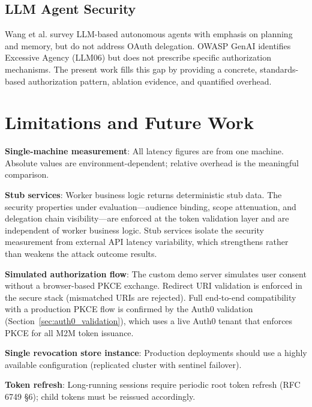 \documentclass[journal]{IEEEtran}
\begin{document}
\subsection{LLM Agent Security}

Wang et al. \cite{wang2024survey} survey LLM-based autonomous agents with
emphasis on planning and memory, but do not address OAuth delegation. OWASP GenAI
\cite{owasp_genai} identifies Excessive Agency (LLM06) but does not prescribe
specific authorization mechanisms. The present work fills this gap by providing
a concrete, standards-based authorization pattern, ablation evidence, and
quantified overhead.


\section{Limitations and Future Work}
\label{sec:limitations}

\textbf{Single-machine measurement}: All latency figures are from one machine.
Absolute values are environment-dependent; relative overhead is the meaningful
comparison.

\textbf{Stub services}: Worker business logic returns deterministic stub data.
The security properties under evaluation---audience binding, scope attenuation,
and delegation chain visibility---are enforced at the token validation layer and
are independent of worker business logic. Stub services isolate the security
measurement from external API latency variability, which strengthens rather than
weakens the attack outcome results.

\textbf{Simulated authorization flow}: The custom demo server simulates user
consent without a browser-based PKCE exchange. Redirect URI validation is
enforced in the secure stack (mismatched URIs are rejected). Full end-to-end
compatibility with a production PKCE flow is confirmed by the Auth0 validation
(Section~\ref{sec:auth0_validation}), which uses a live Auth0 tenant that
enforces PKCE for all M2M token issuance.

\textbf{Single revocation store instance}: Production deployments should use a
highly available configuration (replicated cluster with sentinel failover).

\textbf{Token refresh}: Long-running sessions require periodic root token refresh
(RFC 6749 §6); child tokens must be reissued accordingly.
\end{document}
